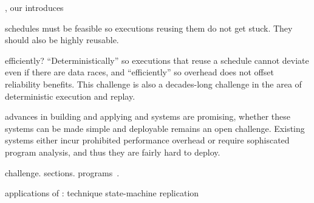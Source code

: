 \tern, 
our 
introduces 


schedules must be feasible so executions reusing them do not get stuck. They
should also be highly reusable.

efficiently?  ``Deterministically'' so executions that reuse a schedule cannot
deviate even if there are data races, and ``efficiently'' so overhead does not
offset reliability benefits. This challenge is also a decades-long challenge in
the area of deterministic execution and replay.

advances in building and applying \smt and \dmt systems are promising, whether
these systems can be made simple and deployable remains an open challenge.
Existing systems either incur prohibited performance overhead or require
sophiscated program analysis, and thus they are fairly hard to deploy.


challenge.
sections.
programs~\cite{dthreads:sosp11}.

applications of \smt: 
technique 
state-machine replication


